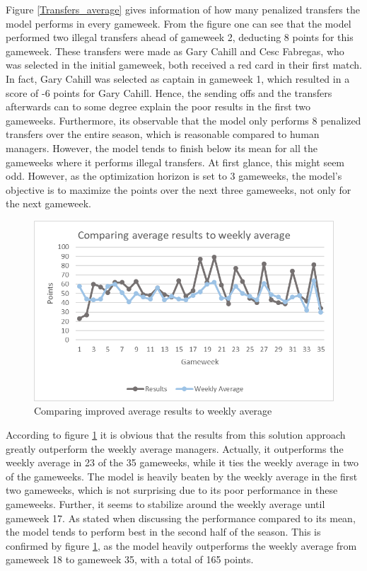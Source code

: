 Figure \ref{Transfers_average} gives information of how many penalized transfers the model performs in every gameweek. From the figure one can see that the model performed two illegal transfers ahead of gameweek 2, deducting 8 points for this gameweek. These transfers were made as Gary Cahill and Cesc Fabregas, who was selected in the initial gameweek, both received a red card in their first match. In fact, Gary Cahill was selected as captain in gameweek 1, which resulted in a score of -6 points for Gary Cahill. Hence, the sending offs and the transfers afterwards can to some degree explain the poor results in the first two gameweeks. Furthermore, its observable that the model only performs 8 penalized transfers over the entire season, which is reasonable compared to human managers. However, the model tends to finish below its mean for all the gameweeks where it performs illegal transfers. At first glance, this might seem odd. However, as the optimization horizon is set to 3 gameweeks, the model's objective is to maximize the points over the next three gameweeks, not only for the next gameweek. 

\begin{figure}[H]
    \centering
    \includegraphics[scale=0.80]{fig/chapter_7/Comparison_average.png}
    \caption{Comparing improved average results to weekly average}
\label{Comparison_average}    
\end{figure} 
According to figure \ref{Comparison_average} it is obvious that the results from this solution approach greatly outperform the weekly average managers. Actually, it outperforms the weekly average in 23 of the 35 gameweeks, while it ties the weekly average in two of the gameweeks. The model is heavily beaten by the weekly average in the first two gameweeks, which is not surprising due to its poor performance in these gameweeks. Further, it seems to stabilize around the weekly average until gameweek 17. As stated when discussing the performance compared to its mean, the model tends to perform best in the second half of the season. This is confirmed by figure \ref{Comparison_average}, as the model heavily outperforms the weekly average from gameweek 18 to gameweek 35, with a total of 165 points. 


